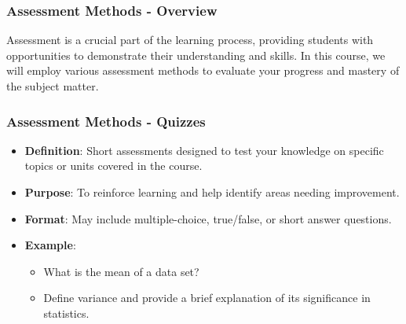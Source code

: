 \documentclass[aspectratio=169]{beamer}
\begin{document}
\begin{frame}[fragile]
    \frametitle{Assessment Methods - Overview}
    Assessment is a crucial part of the learning process, providing students with opportunities to demonstrate their understanding and skills. In this course, we will employ various assessment methods to evaluate your progress and mastery of the subject matter.
\end{frame}

\begin{frame}[fragile]
    \frametitle{Assessment Methods - Quizzes}
    \begin{itemize}
        \item \textbf{Definition}: Short assessments designed to test your knowledge on specific topics or units covered in the course.
        \item \textbf{Purpose}: To reinforce learning and help identify areas needing improvement.
        \item \textbf{Format}: May include multiple-choice, true/false, or short answer questions.
        \item \textbf{Example}: 
        \begin{itemize}
            \item What is the mean of a data set?
            \item Define variance and provide a brief explanation of its significance in statistics.
        \end{itemize}
    \end{itemize}
\end{frame}
\end{document}
